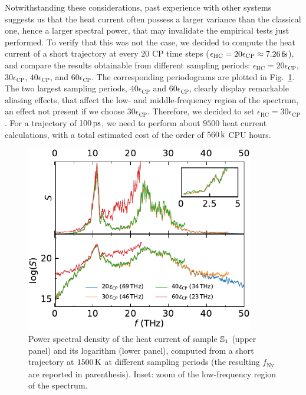 Notwithstanding these considerations, past experience with other systems suggests us that the \abinitio heat current often possess a larger variance than the classical one,  hence a larger spectral power, that may invalidate the empirical tests just performed. 
To verify that this was not the case, we decided to compute the \abinitio heat current of a short trajectory at every $20$ CP time steps ($\epsilon_\mathrm{HC} = 20 \epsilon_\mathrm{CP} \approx 7.26\,\mathrm{fs}$), and compare the results obtainable from different sampling periods: $\epsilon_\mathrm{HC} = 20\epsilon_\mathrm{CP}$, $30\epsilon_\mathrm{CP}$, $40\epsilon_\mathrm{CP}$, and $60\epsilon_\mathrm{CP}$. 
The corresponding periodograms are plotted in Fig.~\ref{fig:results-quantum-dt-choice}. The two largest sampling periods, $40\epsilon_\mathrm{CP}$ and $60\epsilon_\mathrm{CP}$, clearly display remarkable aliasing effects, that affect the low- and middle-frequency region of the spectrum, an effect not present if we choose $30\epsilon_\mathrm{CP}$. 
Therefore, we decided to set $\epsilon_\mathrm{HC} = 30\epsilon_\mathrm{CP}$. For a trajectory of $100\,\mathrm{ps}$, we need to perform about $9500$ heat current calculations, with a total estimated cost of the order of $560\,\mathrm{k}$ CPU hours. 

\begin{figure}[!tb]
    \centering
    \includegraphics[width=10cm]{chapters/chapter6/figures/qsilica_432_1500K_dt_choice.pdf}
    \caption{Power spectral density of the \abinitio heat current of sample $\S1$ (upper panel) and its logarithm (lower panel), computed from a short trajectory at $1500\,\mathrm{K}$ at different sampling periods (the resulting $f_\mathrm{Ny}$ are reported in parenthesis). Inset: zoom of the low-frequency region of the spectrum. 
    }
    \label{fig:results-quantum-dt-choice}
\end{figure}


